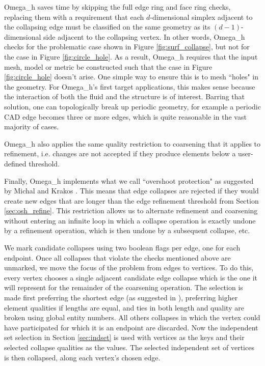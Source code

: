 Omega\_h saves time by skipping the full edge ring and face
ring checks, replacing them with a requirement that each $d$-dimensional simplex
adjacent to the collapsing edge must be classified on the same geometry
as its $(d-1)$-dimensional side adjacent to the collapsing vertex.
In other words, Omega\_h checks for the problematic case shown in Figure
\ref{fig:surf_collapse}, but not for the case in Figure \ref{fig:circle_hole}.
As a result, Omega\_h requires that the input mesh, model or metric be
constructed such that the case in Figure \ref{fig:circle_hole} doesn't arise.
One simple way to ensure this is to mesh ``holes" in the geometry.
For Omega\_h's first target applications,
this makes sense because the interaction of both the fluid and the structure
is of interest.
Barring that solution, one can topologically break up periodic geometry,
for example a periodic CAD edge becomes three or more edges,
which is quite reasonable in the vast majority of cases.

Omega\_h also applies the same quality restriction to coarsening
that it applies to refinement, i.e. changes are not accepted if they produce
elements below a user-defined threshold.

Finally, Omega\_h implements what we call ``overshoot protection"
as suggested by Michal and Krakos \cite{michal2012anisotropic}.
This means that edge collapses are rejected if they would create
new edges that are longer than the edge refinement threshold
from Section \ref{sec:osh_refine}.
This restriction allows us to alternate refinement and coarsening
without entering an infinite loop in which a collapse operation
is exactly undone by a refinement operation, which is then
undone by a subsequent collapse, etc.

We mark candidate collapses using two boolean flags per edge, one for each
endpoint.
Once all collapses that violate the checks mentioned above are unmarked,
we move the focus of the problem from edges to vertices.
To do this, every vertex chooses a single adjacent candidate edge collapse
which is the one it will represent for the remainder of the coarsening operation.
The selection is made first preferring the shortest edge
(as suggested in \cite{michal2012anisotropic}), preferring
higher element qualities if lengths are equal, and ties in
both length and quality are broken using global entity numbers.
All others collapses in which the vertex could have participated for which it is an endpoint are discarded.
Now the independent set selection in Section \ref{sec:indset} is used
with vertices as the keys and their selected collapse qualities as the
values.
The selected independent set of vertices is then collapsed, along each
vertex's chosen edge.

